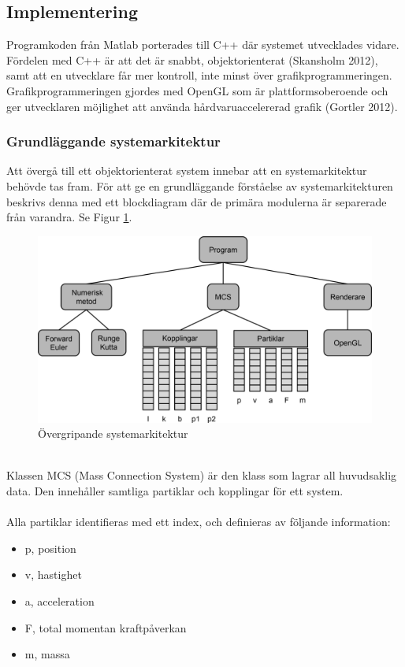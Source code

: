 \documentclass[a4paper,12pt,oneside,final,swedish]{extarticle}
\begin{document}
\subsection{Implementering}
Programkoden från Matlab porterades till C++ där systemet utvecklades vidare. Fördelen med C++ är att det är snabbt, objektorienterat (Skansholm 2012), samt att en utvecklare får mer kontroll, inte minst över grafikprogrammeringen. Grafikprogrammeringen gjordes med OpenGL som är plattformsoberoende och ger utvecklaren möjlighet att använda hårdvaruaccelererad grafik (Gortler 2012).
\subsubsection{Grundläggande systemarkitektur}
Att övergå till ett objektorienterat system innebar att en systemarkitektur behövde tas fram. 
För att ge en grundläggande förståelse av systemarkitekturen beskrivs denna med ett blockdiagram där de primära modulerna är separerade från varandra. 
Se Figur \ref{systemark}.
\begin{figure}[h!]
  \begin{center}
    \includegraphics[width=16cm]{Bilder/Arkitektur.png} 
  \end{center}
  \caption{Övergripande systemarkitektur}
  \label{systemark}
\end{figure}
\\Klassen MCS (Mass Connection System) är den klass som lagrar all huvudsaklig data. Den innehåller samtliga partiklar och kopplingar för ett system.
\\\\Alla partiklar identifieras med ett index, och definieras av följande information:
\begin{itemize}
  \item p, position
  \item v, hastighet
  \item a, acceleration
  \item F, total momentan kraftpåverkan
  \item m, massa
\end{itemize}
\end{document}
